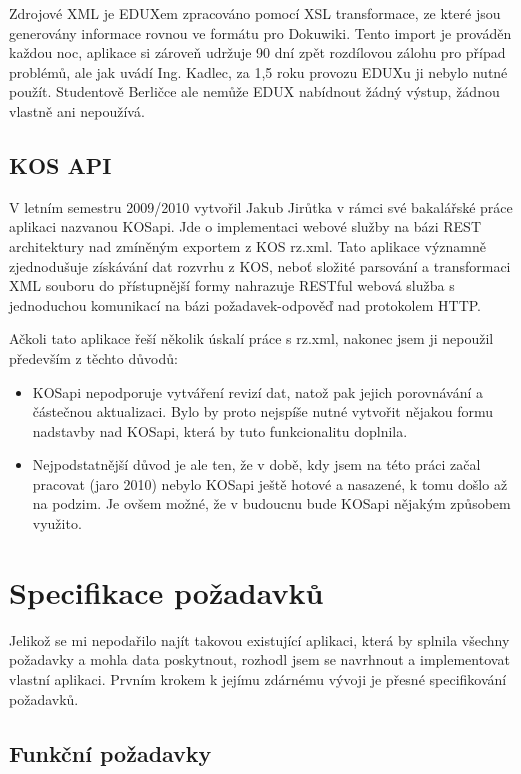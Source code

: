 \documentclass[11pt,twoside,a4paper]{book}
\begin{document}
Zdrojové XML je EDUXem zpracováno pomocí XSL transformace, ze které jsou generovány informace rovnou ve formátu pro Dokuwiki. Tento import je prováděn každou noc, aplikace si zároveň udržuje 90 dní zpět rozdílovou zálohu pro případ problémů, ale jak uvádí Ing. Kadlec, za 1,5 roku provozu EDUXu ji nebylo nutné použít. Studentově Berličce ale nemůže EDUX nabídnout žádný výstup, žádnou  vlastně ani nepoužívá.

\subsection{KOS API}
V letním semestru 2009/2010 vytvořil Jakub Jirůtka v rámci své bakalářské práce\cite{jirutka} aplikaci nazvanou KOSapi. Jde o implementaci webové služby na bázi REST architektury nad zmíněným exportem z KOS rz.xml. Tato aplikace významně zjednodušuje získávání dat rozvrhu z KOS, neboť složité parsování a transformaci XML souboru do přístupnější formy nahrazuje RESTful webová služba s jednoduchou komunikací na bázi požadavek-odpověď nad protokolem HTTP.

Ačkoli tato aplikace řeší několik úskalí práce s rz.xml, nakonec jsem ji nepoužil především z těchto důvodů:
\begin{itemize}
\item KOSapi nepodporuje vytváření revizí dat, natož pak jejich porovnávání a částečnou aktualizaci. Bylo by proto nejspíše nutné vytvořit nějakou formu nadstavby nad KOSapi, která by tuto funkcionalitu doplnila.
\item Nejpodstatnější důvod je ale ten, že v době, kdy jsem na této práci začal pracovat (jaro 2010) nebylo KOSapi ještě hotové a nasazené, k tomu došlo až na podzim. Je ovšem možné, že v budoucnu bude KOSapi nějakým způsobem využito.
\end{itemize}

\section{Specifikace požadavků}
Jelikož se mi nepodařilo najít takovou existující aplikaci, která by splnila všechny požadavky a mohla data poskytnout, rozhodl jsem se navrhnout a implementovat vlastní aplikaci. Prvním krokem k jejímu zdárnému vývoji je přesné specifikování požadavků.
\subsection{Funkční požadavky}
\end{document}
